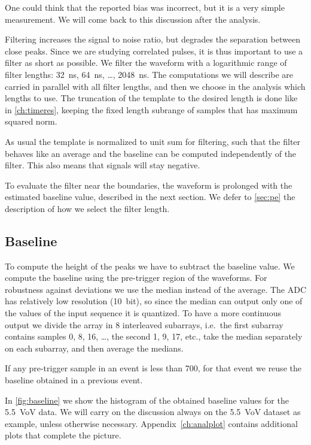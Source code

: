 One could think that the reported bias was incorrect, but it is a very simple
measurement. We will come back to this discussion after the analysis.

Filtering increases the signal to noise ratio, but degrades the separation
between close peaks. Since we are studying correlated pulses, it is thus
important to use a filter as short as possible. We filter the waveform with a
logarithmic range of filter lengths: \SI{32}{ns}, \SI{64}{ns}, \ldots,
\SI{2048}{ns}. The computations we will describe are carried in parallel with
all filter lengths, and then we choose in the analysis which lengths to use.
The truncation of the template to the desired length is done like in
\autoref{ch:timeres}, keeping the fixed length subrange of samples that has
maximum squared norm.


As usual the template is normalized to unit sum for filtering, such that the
filter behaves like an average and the baseline can be computed independently
of the filter. This also means that signals will stay negative.

To evaluate the filter near the boundaries, the waveform is prolonged with the
estimated baseline value, described in the next section. We defer to
\autoref{sec:pe} the description of how we select the filter length.

\subsection{Baseline}

To compute the height of the peaks we have to subtract the baseline value. We
compute the baseline using the pre-trigger region of the waveforms. For
robustness against deviations we use the median instead of the average. The ADC
has relatively low resolution (10~bit), so since the median can output only one
of the values of the input sequence it is quantized. To have a more continuous
output we divide the array in 8 interleaved subarrays, i.e.\ the first subarray
contains samples 0, 8, 16, \dots, the second 1, 9, 17, etc., take the median
separately on each subarray, and then average the medians.

If any pre-trigger sample in an event is less than 700, for that event we reuse
the baseline obtained in a previous event.

In \autoref{fig:baseline} we show the histogram of the obtained baseline values
for the \SI{5.5}{VoV} data. We will carry on the discussion always on the
\SI{5.5}{VoV} dataset as example, unless otherwise necessary.
Appendix~\ref{ch:analplot} contains additional plots that complete the picture.

